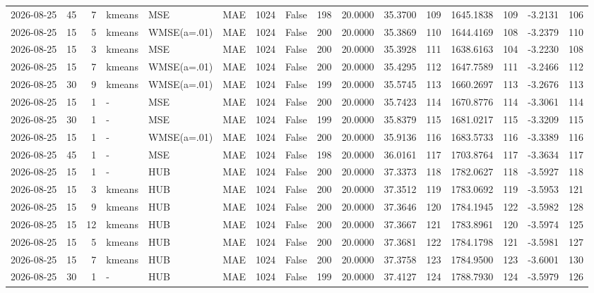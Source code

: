 \documentclass[10pt]{article}
\begin{document}
\begin{landscape}
\begin{longtable}{@{}lrrlllrcrrrrrrrr@{}}
2026-08-25 & 45 & 7 & kmeans & MSE & MAE & 1024 & False & 198 & 20.0000 & 35.3700 & 109 & 1645.1838 & 109 & -3.2131 & 106 \\
2026-08-25 & 15 & 5 & kmeans & WMSE(a=.01) & MAE & 1024 & False & 200 & 20.0000 & 35.3869 & 110 & 1644.4169 & 108 & -3.2379 & 110 \\
2026-08-25 & 15 & 3 & kmeans & MSE & MAE & 1024 & False & 200 & 20.0000 & 35.3928 & 111 & 1638.6163 & 104 & -3.2230 & 108 \\
2026-08-25 & 15 & 7 & kmeans & WMSE(a=.01) & MAE & 1024 & False & 200 & 20.0000 & 35.4295 & 112 & 1647.7589 & 111 & -3.2466 & 112 \\
2026-08-25 & 30 & 9 & kmeans & WMSE(a=.01) & MAE & 1024 & False & 199 & 20.0000 & 35.5745 & 113 & 1660.2697 & 113 & -3.2676 & 113 \\
2026-08-25 & 15 & 1 & - & MSE & MAE & 1024 & False & 200 & 20.0000 & 35.7423 & 114 & 1670.8776 & 114 & -3.3061 & 114 \\
2026-08-25 & 30 & 1 & - & MSE & MAE & 1024 & False & 199 & 20.0000 & 35.8379 & 115 & 1681.0217 & 115 & -3.3209 & 115 \\
2026-08-25 & 15 & 1 & - & WMSE(a=.01) & MAE & 1024 & False & 200 & 20.0000 & 35.9136 & 116 & 1683.5733 & 116 & -3.3389 & 116 \\
2026-08-25 & 45 & 1 & - & MSE & MAE & 1024 & False & 198 & 20.0000 & 36.0161 & 117 & 1703.8764 & 117 & -3.3634 & 117 \\
2026-08-25 & 15 & 1 & - & HUB & MAE & 1024 & False & 200 & 20.0000 & 37.3373 & 118 & 1782.0627 & 118 & -3.5927 & 118 \\
2026-08-25 & 15 & 3 & kmeans & HUB & MAE & 1024 & False & 200 & 20.0000 & 37.3512 & 119 & 1783.0692 & 119 & -3.5953 & 121 \\
2026-08-25 & 15 & 9 & kmeans & HUB & MAE & 1024 & False & 200 & 20.0000 & 37.3646 & 120 & 1784.1945 & 122 & -3.5982 & 128 \\
2026-08-25 & 15 & 12 & kmeans & HUB & MAE & 1024 & False & 200 & 20.0000 & 37.3667 & 121 & 1783.8961 & 120 & -3.5974 & 125 \\
2026-08-25 & 15 & 5 & kmeans & HUB & MAE & 1024 & False & 200 & 20.0000 & 37.3681 & 122 & 1784.1798 & 121 & -3.5981 & 127 \\
2026-08-25 & 15 & 7 & kmeans & HUB & MAE & 1024 & False & 200 & 20.0000 & 37.3758 & 123 & 1784.9500 & 123 & -3.6001 & 130 \\
2026-08-25 & 30 & 1 & - & HUB & MAE & 1024 & False & 199 & 20.0000 & 37.4127 & 124 & 1788.7930 & 124 & -3.5979 & 126 \\

\end{longtable}
\end{landscape}
\end{document}
